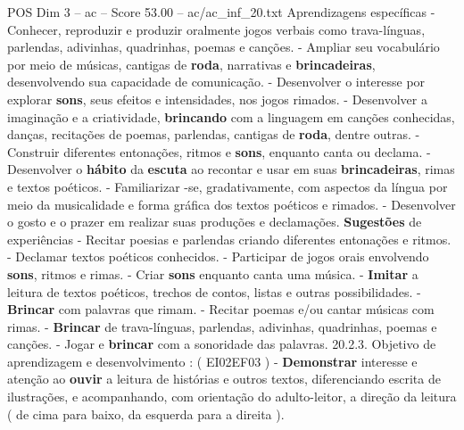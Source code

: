 \begin{textsample}{POS Dim 3 – ac – Score 53.00 – ac/ac\_inf\_20.txt}
Aprendizagens específicas - Conhecer, reproduzir e produzir oralmente jogos verbais como trava-línguas, parlendas, adivinhas, quadrinhas, poemas e canções. - Ampliar seu vocabulário por meio de músicas, cantigas de \textbf{roda}, narrativas e \textbf{brincadeiras}, desenvolvendo sua capacidade de comunicação. - Desenvolver o interesse por explorar \textbf{sons}, seus efeitos e intensidades, nos jogos rimados. - Desenvolver a imaginação e a criatividade, \textbf{brincando} com a linguagem em canções conhecidas, danças, recitações de poemas, parlendas, cantigas de \textbf{roda}, dentre outras. - Construir diferentes entonações, ritmos e \textbf{sons}, enquanto canta ou declama. - Desenvolver o \textbf{hábito} da \textbf{escuta} ao recontar e usar em suas \textbf{brincadeiras}, rimas e textos poéticos. - Familiarizar -se, gradativamente, com aspectos da língua por meio da musicalidade e forma gráfica dos textos poéticos e rimados. - Desenvolver o gosto e o prazer em realizar suas produções e declamações. \textbf{Sugestões} de experiências - Recitar poesias e parlendas criando diferentes entonações e ritmos. - Declamar textos poéticos conhecidos. - Participar de jogos orais envolvendo \textbf{sons}, ritmos e rimas. - Criar \textbf{sons} enquanto canta uma música. - \textbf{Imitar} a leitura de textos poéticos, trechos de contos, listas e outras possibilidades. - \textbf{Brincar} com palavras que rimam. - Recitar poemas e/ou cantar músicas com rimas. - \textbf{Brincar} de trava-línguas, parlendas, adivinhas, quadrinhas, poemas e canções. - Jogar e \textbf{brincar} com a sonoridade das palavras. 20.2.3.
Objetivo de aprendizagem e desenvolvimento : ( EI02EF03 ) - \textbf{Demonstrar} interesse e atenção ao \textbf{ouvir} a leitura de histórias e outros textos, diferenciando escrita de ilustrações, e acompanhando, com orientação do adulto-leitor, a direção da leitura ( de cima para baixo, da esquerda para a direita ).

\end{textsample}
